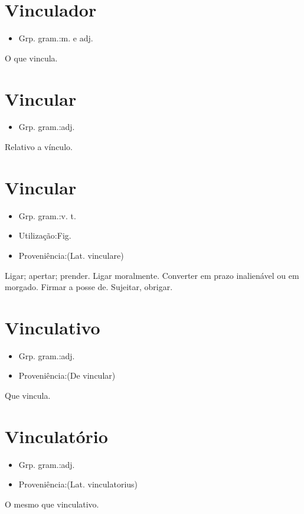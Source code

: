 \documentclass{article}
\begin{document}
\section{Vinculador}
\begin{itemize}
\item {Grp. gram.:m.  e  adj.}
\end{itemize}
O que vincula.
\section{Vincular}
\begin{itemize}
\item {Grp. gram.:adj.}
\end{itemize}
Relativo a vínculo.
\section{Vincular}
\begin{itemize}
\item {Grp. gram.:v. t.}
\end{itemize}
\begin{itemize}
\item {Utilização:Fig.}
\end{itemize}
\begin{itemize}
\item {Proveniência:(Lat. \textunderscore vinculare\textunderscore )}
\end{itemize}
Ligar; apertar; prender.
Ligar moralmente.
Converter em prazo inalienável ou em morgado.
Firmar a posse de.
Sujeitar, obrigar.
\section{Vinculativo}
\begin{itemize}
\item {Grp. gram.:adj.}
\end{itemize}
\begin{itemize}
\item {Proveniência:(De \textunderscore vincular\textunderscore )}
\end{itemize}
Que vincula.
\section{Vinculatório}
\begin{itemize}
\item {Grp. gram.:adj.}
\end{itemize}
\begin{itemize}
\item {Proveniência:(Lat. \textunderscore vinculatorius\textunderscore )}
\end{itemize}
O mesmo que \textunderscore vinculativo\textunderscore .
\end{document}
